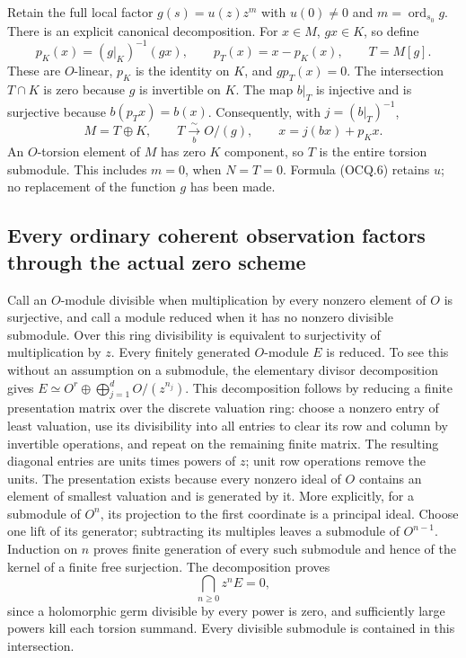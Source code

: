 Retain the full local factor
$g(s)=u(z)z^m$ with $u(0)\ne0$ and $m=\operatorname{ord}_{s_0}g$.
There is an explicit canonical decomposition.  For $x\in M$, $gx\in K$,
so define
\[
 p_K(x)=(g|_K)^{-1}(gx),\qquad p_T(x)=x-p_K(x),\qquad
 T=M[g].                                                       \tag{OCQ.6}
\]
These are $O$-linear, $p_K$ is the identity on $K$, and $gp_T(x)=0$.
The intersection $T\cap K$ is zero because $g$ is invertible on $K$.
The map $b|_T$ is injective and is surjective because
$b(p_Tx)=b(x)$.  Consequently, with $j=(b|_T)^{-1}$,
\[
 M=T\oplus K,\qquad T\xrightarrow[\ b\ ]{\sim}O/(g),\qquad
 x=j(bx)+p_Kx.                                                 \tag{OCQ.7}
\]
An $O$-torsion element of $M$ has zero $K$ component, so $T$ is the
entire torsion submodule.  This includes $m=0$, when $N=T=0$.
Formula (OCQ.6) retains $u$; no replacement of the function $g$ has
been made.

\subsection{Every ordinary coherent observation factors through the actual zero scheme}

Call an $O$-module divisible when multiplication by every nonzero
element of $O$ is surjective, and call a module reduced when it has
no nonzero divisible submodule.  Over this ring divisibility is
equivalent to surjectivity of multiplication by $z$.
Every finitely generated $O$-module $E$ is reduced.  To see this without
an assumption on a submodule, the elementary divisor decomposition gives
$E\simeq O^r\oplus\bigoplus_{j=1}^d O/(z^{n_j})$.
This decomposition follows by reducing a finite presentation matrix
over the discrete valuation ring: choose a nonzero entry of least
valuation, use its divisibility into all entries to clear its row and
column by invertible operations, and repeat on the remaining finite
matrix.  The resulting diagonal entries are units times powers of $z$;
unit row operations remove the units.  The presentation exists because
every nonzero ideal of $O$ contains an element of smallest valuation
and is generated by it.  More explicitly, for a submodule of $O^n$,
its projection to the first coordinate is a principal ideal.  Choose
one lift of its generator; subtracting its multiples leaves a submodule
of $O^{n-1}$.  Induction on $n$ proves finite generation of every such
submodule and hence of the kernel of a finite free surjection.
The decomposition proves
\[
 \bigcap_{n\ge0}z^nE=0,                                      \tag{OCQ.8}
\]
since a holomorphic germ divisible by every power is zero, and sufficiently
large powers kill each torsion summand.  Every divisible submodule is
contained in this intersection.

